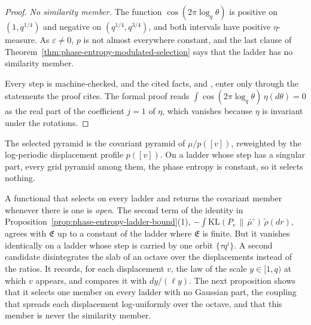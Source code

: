 \begin{proof}
\emph{No similarity member.} The function $\cos(2\pi\log_q\theta)$ is positive on $(1, q^{1/4})$
and negative on $(q^{1/4}, q^{3/4})$, and both intervals have positive $\eta$-measure. As
$\varepsilon \ne 0$, $p$ is not almost everywhere constant, and the last clause of
Theorem~\ref{thm:phase-entropy-modulated-selection} says that the ladder has no similarity member.

Every step is machine-checked, and the cited facts,  and , enter only
through the statements the proof cites. The formal proof reads
$\int\cos(2\pi\log_q\theta)\,\eta(d\theta) = 0$ as the real part of the coefficient $j = 1$ of
$\eta$, which vanishes because $\eta$ is invariant under the rotations.
\end{proof}

The selected pyramid is the covariant pyramid of $\mu/p([v])$, reweighted by the log-periodic
displacement profile $p([v])$. On a ladder whose step has a singular part, every grid pyramid among
them, the phase entropy is constant, so it selects nothing.

A functional that selects on every ladder and returns the covariant member whenever there is one is
\emph{open}. The second term of the identity in
Proposition~\ref{prop:phase-entropy-ladder-bound}(1),
$-\int\mathrm{KL}(P_r \,\|\, \bar\mu^\circ)\,\tilde\rho(dr)$, agrees with $\mathfrak{E}$ up to a
constant of the ladder where $\mathfrak{E}$ is finite. But it vanishes identically on a ladder whose
step is carried by one orbit $\{\tau q^i\}$. A second candidate disintegrates the slab of an octave
over the displacements instead of the ratios. It records, for each displacement $v$, the law of
the scale $y \in [1,q)$ at which $v$ appears, and compares it with $dy/(\ell y)$. The next
proposition shows that it selects one member on every ladder with no Gaussian part, the coupling
that spreads each displacement log-uniformly over the octave, and that this member is never the
similarity member.

